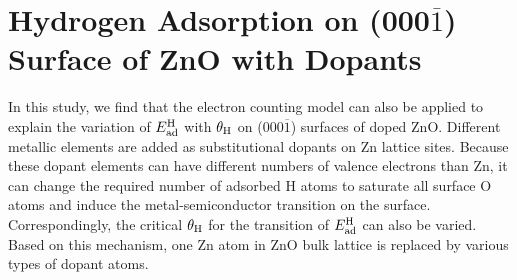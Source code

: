 \section{Hydrogen Adsorption on (000$\overline{1}$) Surface of ZnO with Dopants}
\label{sec:doped}

In this study, we find that the electron counting model can also be applied to explain the variation of $E_{\textup{ad}}^{\textup{H}}$ with $\theta_{\textup{H}}$ on (000$\overline{1}$) surfaces of doped ZnO\cite{pashley1989electron}. Different metallic elements are added as substitutional dopants on Zn lattice sites. Because these dopant elements can have different numbers of valence electrons than Zn, it can change the required number of adsorbed H atoms to saturate all surface O atoms and induce the metal-semiconductor transition on the surface. Correspondingly, the critical $\theta_{\textup{H}}$ for the transition of $E_{\textup{ad}}^{\textup{H}}$ can also be varied.  Based on this mechanism, one Zn atom in ZnO bulk lattice is replaced by various types of dopant atoms. 

